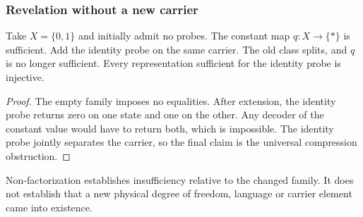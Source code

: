 \subsubsection{Revelation without a new carrier}

\begin{example}\label{ex:old-bit}
Take $X=\{0,1\}$ and initially admit no probes. The constant map
$q:X\to\{*\}$ is sufficient. Add the identity probe on the same
carrier. The old class splits, and $q$ is no longer sufficient.
Every representation sufficient for the identity probe is injective.
\end{example}
\begin{proof}
The empty family imposes no equalities. After extension, the identity
probe returns zero on one state and one on the other. Any decoder of
the constant value would have to return both, which is impossible.
The identity probe jointly separates the carrier, so the final claim
is the universal compression obstruction.
\end{proof}
Non-factorization establishes insufficiency relative to the changed
family. It does not establish that a new physical degree of freedom,
language or carrier element came into existence.
